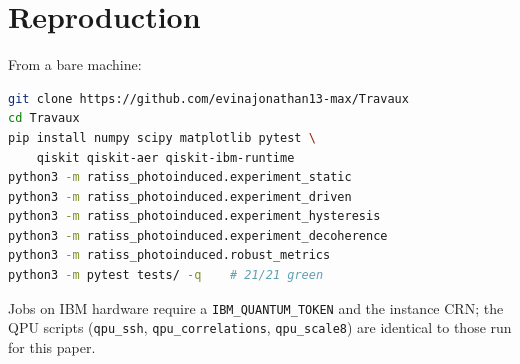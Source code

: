 \documentclass[11pt]{article}
\begin{document}
\appendix

\section{Reproduction}
\label{sec:appendix}

From a bare machine:
\begin{lstlisting}[language=bash]
git clone https://github.com/evinajonathan13-max/Travaux
cd Travaux
pip install numpy scipy matplotlib pytest \
    qiskit qiskit-aer qiskit-ibm-runtime
python3 -m ratiss_photoinduced.experiment_static
python3 -m ratiss_photoinduced.experiment_driven
python3 -m ratiss_photoinduced.experiment_hysteresis
python3 -m ratiss_photoinduced.experiment_decoherence
python3 -m ratiss_photoinduced.robust_metrics
python3 -m pytest tests/ -q    # 21/21 green
\end{lstlisting}

Jobs on IBM hardware require a \texttt{IBM\_QUANTUM\_TOKEN} and the
instance CRN; the QPU scripts (\texttt{qpu\_ssh}, \texttt{qpu\_correlations},
\texttt{qpu\_scale8}) are identical to those run for this paper.
\end{document}
